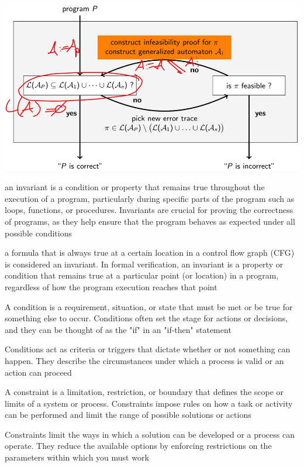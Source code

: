 \documentclass[landscape, a4paper]{article}
\begin{document}
\begin{minipage}[t]{0.2\linewidth}
	\includegraphics[width=0.8\linewidth]{./figures/trace_abstraction_refinement.png}
	\begin{betterlist}
		\item an \alert{invariant} is a condition or property that remains true throughout the execution of a program, particularly during specific parts of the program such as loops, functions, or procedures. Invariants are crucial for proving the correctness of programs, as they help ensure that the program behaves as expected under all possible conditions
		\begin{betterlist}
			\item a formula that is always true at a certain location in a control flow graph (CFG) is considered an invariant. In formal verification, an invariant is a property or condition that remains true at a particular point (or location) in a program, regardless of how the program execution reaches that point
		\end{betterlist}

		\item A \alert{condition} is a requirement, situation, or state that must be met or be true for something else to occur. Conditions often set the stage for actions or decisions, and they can be thought of as the "if" in an "if-then" statement
		\begin{betterlist}
			\item Conditions act as criteria or triggers that dictate whether or not something can happen. They describe the circumstances under which a process is valid or an action can proceed
		\end{betterlist}
		\item A \alert{constraint} is a limitation, restriction, or boundary that defines the scope or limits of a system or process. Constraints impose rules on how a task or activity can be performed and limit the range of possible solutions or actions
		\begin{betterlist}
			\item Constraints limit the ways in which a solution can be developed or a process can operate. They reduce the available options by enforcing restrictions on the parameters within which you must work
		\end{betterlist}


\end{betterlist}
\end{minipage}
\end{document}
